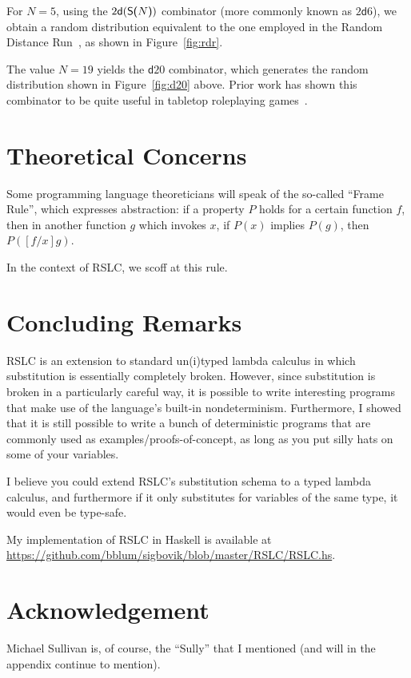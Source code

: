 \documentclass[10pt]{sigplanconf}
\begin{document}
For $N = 5$, using the $2\mathsf{d}(\textsf{S(}N\textsf{)})$ combinator (more commonly known as $2\mathsf{d}6$), we obtain a random distribution equivalent to the one employed in the Random Distance Run~\cite{rdr}, as shown in Figure~\ref{fig:rdr}.

The value $N = 19$ yields the $\mathsf{d}20$ combinator, which generates the random distribution shown in Figure~\ref{fig:d20} above. Prior work has shown this combinator to be quite useful in tabletop roleplaying games~\cite{dnd-mm,dnd-phb,dnd-dmg}.

\section{Theoretical Concerns}

Some programming language theoreticians will speak of the so-called ``Frame Rule'', which expresses abstraction: if a property $P$ holds for a certain function $f$, then in another function $g$ which invokes $x$, if $P(x)$ implies $P(g)$, then $P([f/x]g)$.

In the context of RSLC, we scoff at this rule.

\section{Concluding Remarks}

RSLC is an extension to standard un(i)typed lambda calculus in which substitution is essentially completely broken. However, since substitution is broken in a particularly careful way, it is possible to write interesting programs that make use of the language's built-in nondeterminism.
Furthermore, I showed that it is still possible to write a bunch of deterministic programs that are commonly used as examples/proofs-of-concept, as long as you put silly hats on some of your variables.

I believe you could extend RSLC's substitution schema to a typed lambda calculus, and furthermore if it only substitutes for variables of the same type, it would even be type-safe.

My implementation of RSLC in Haskell is available at \url{https://github.com/bblum/sigbovik/blob/master/RSLC/RSLC.hs}.

\section*{Acknowledgement}

Michael Sullivan is, of course, the ``Sully'' that I mentioned (and will in the appendix continue to mention).
\end{document}
